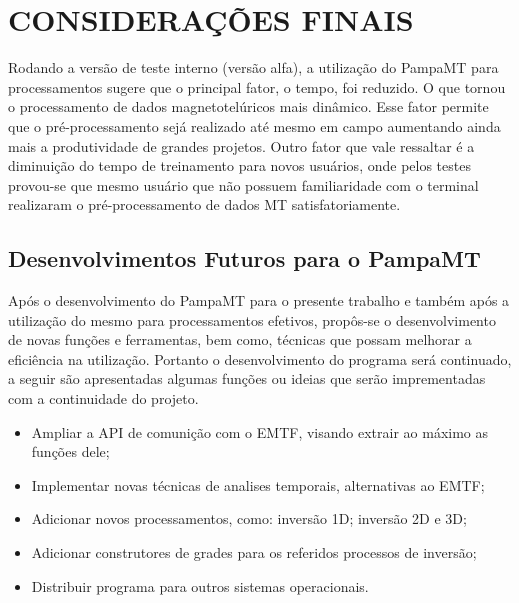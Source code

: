 \chapter{CONSIDERAÇÕES FINAIS}
    
    Rodando a versão de teste interno (versão alfa), a utilização do PampaMT para processamentos sugere que o principal fator, o tempo, foi reduzido. O que tornou o processamento de dados magnetotelúricos mais dinâmico. Esse fator permite que o pré-processamento sejá realizado até mesmo em campo aumentando ainda mais a produtividade de grandes projetos. Outro fator que vale ressaltar é a diminuição do tempo de treinamento para novos usuários, onde pelos testes provou-se que mesmo usuário que não possuem familiaridade com o terminal realizaram o pré-processamento de dados MT  satisfatoriamente.     
    
    \section{Desenvolvimentos Futuros para o PampaMT}
        
        Após o desenvolvimento do PampaMT para o presente trabalho e também após a utilização do mesmo para processamentos efetivos, propôs-se o desenvolvimento de novas funções e ferramentas, bem como, técnicas que possam melhorar a eficiência na utilização. Portanto o desenvolvimento do programa será continuado, a seguir são apresentadas algumas funções ou ideias que serão imprementadas com a continuidade do projeto.
        
        \begin{itemize}
         \item Ampliar a API de comunição com o EMTF, visando extrair ao máximo as funções dele;
         \item Implementar novas técnicas de analises temporais, alternativas ao EMTF;
         \item Adicionar novos processamentos, como: inversão 1D; inversão 2D e 3D;
         \item Adicionar construtores de grades para os referidos processos de inversão;
         \item Distribuir programa para outros sistemas operacionais.
        \end{itemize}
